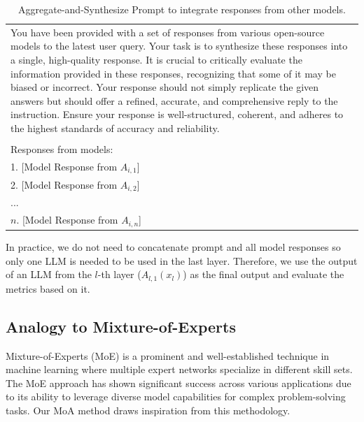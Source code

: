 \documentclass{article}
\newcommand{\jue}[1]{{\color{pastel-lavender}[Jue: #1]}}
\begin{document}
\begin{table}[t]
    \centering
    \small
    \caption{Aggregate-and-Synthesize Prompt to integrate responses from other models.}
    \begin{tabular}{@{}p{1\linewidth}@{}}
    \toprule
    You have been provided with a set of responses from various open-source models to the latest user query. Your task is to synthesize these responses into a single, high-quality response. It is crucial to critically evaluate the information provided in these responses, recognizing that some of it may be biased or incorrect. Your response should not simply replicate the given answers but should offer a refined, accurate, and comprehensive reply to the instruction. Ensure your response is well-structured, coherent, and adheres to the highest standards of accuracy and reliability.
    \\ \\
    Responses from models:
    \\
    1. [Model Response from $A_{i,1}$] \\
    2. [Model Response from $A_{i,2}$] \\
    ... \\
    $n$. [Model Response from $A_{i,n}$] \\
    \bottomrule
    \end{tabular}
    \label{tab:template}
\end{table}

In practice, we do not need to concatenate prompt and all model responses so only one LLM is needed to be used in the last layer. 
Therefore, we use the output of an LLM from the $l$-th layer (\( A_{l,1}(x_l) \))
as the final output and evaluate the metrics based on it.

\subsection{Analogy to Mixture-of-Experts}

Mixture-of-Experts (MoE) \citep{moe} is a prominent and well-established technique in machine learning where multiple expert networks specialize in different skill sets. 
The MoE approach has shown significant success across various applications due to its ability to leverage diverse model capabilities for complex problem-solving tasks. 
Our MoA method draws inspiration from this methodology.
\end{document}
